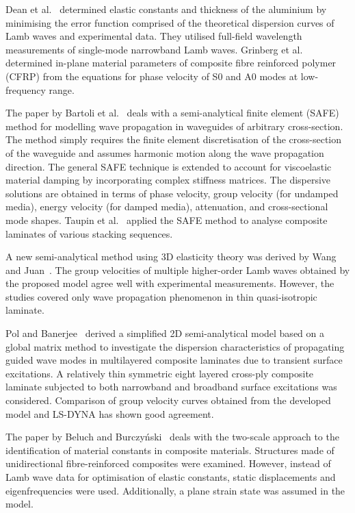 \documentclass[preprint,12pt]{elsarticle}
\begin{document}
	Dean et al.~\cite{Dean2008} determined elastic constants and thickness of the aluminium by minimising the error function comprised of the theoretical dispersion curves of Lamb waves and experimental data. They utilised full-field wavelength measurements of single-mode narrowband Lamb waves. Grinberg et al.~\cite{Grimberg2010} determined in-plane material parameters of composite fibre reinforced polymer (CFRP) from the equations for phase velocity of S0 and A0 modes at low-frequency range. 
	
	The paper by Bartoli et al.~\cite{Bartoli2006} deals with a semi-analytical finite element (SAFE) method for modelling wave propagation in waveguides of arbitrary cross-section. The method simply requires the finite element discretisation of the cross-section of the waveguide and assumes harmonic motion along the wave propagation direction. The general SAFE technique is extended to account for viscoelastic material damping by incorporating complex stiffness matrices. The dispersive solutions are obtained in terms of phase velocity, group velocity (for undamped media), energy velocity (for damped media), attenuation, and cross-sectional mode shapes. Taupin et al.~\cite{Taupin2011} applied the SAFE method to analyse composite laminates of various stacking sequences.
	
	A new semi-analytical method using 3D elasticity theory was derived by Wang and Juan~\cite{Wang2007}. The group velocities of multiple higher-order Lamb waves obtained by the proposed model agree well with experimental measurements. However, the studies covered only wave propagation phenomenon in thin quasi-isotropic laminate. 
	
	Pol and Banerjee~\cite{Pol2013} derived a simplified 2D semi-analytical model based on a global matrix method to investigate the dispersion characteristics of propagating guided wave modes in multilayered composite laminates due to transient surface excitations. A relatively thin symmetric eight layered cross-ply composite laminate subjected to both narrowband and broadband surface excitations was considered. Comparison of group velocity curves obtained from the developed model and LS-DYNA has shown good agreement.
	
	The paper by Beluch and Burczyński~\cite{Beluch2014} deals with the two-scale approach to the identification of material constants in composite materials. Structures made of unidirectional fibre-reinforced composites were examined. However, instead of Lamb wave data for optimisation of elastic constants, static displacements and eigenfrequencies were used. Additionally, a plane strain state was assumed in the model.
	
\end{document}
